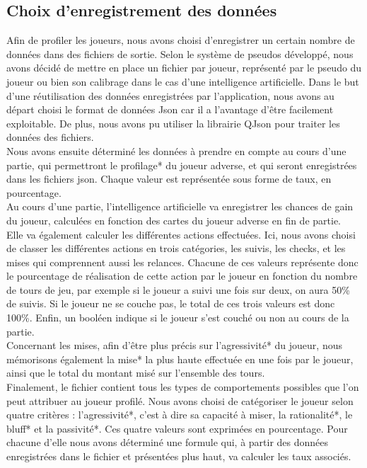 \documentclass{report}
\begin{document}
\subsection{Choix d'enregistrement des données}

\hspace{0.5cm}Afin de profiler les joueurs, nous avons choisi d'enregistrer un certain nombre de données dans des fichiers de sortie. Selon le système de pseudos développé, nous avons décidé de mettre en place un fichier par joueur, représenté par le pseudo du joueur ou bien son calibrage dans le cas d'une intelligence artificielle. Dans le but d'une réutilisation des données enregistrées par l'application, nous avons au départ choisi le format de données Json car il a l'avantage d'être facilement exploitable. De plus, nous avons pu utiliser la librairie QJson pour traiter les données des fichiers.\\

Nous avons ensuite déterminé les données à prendre en compte au cours d'une partie, qui permettront le profilage* du joueur adverse, et qui seront enregistrées dans les fichiers json. Chaque valeur est représentée sous forme de taux, en pourcentage.\\

Au cours d'une partie, l'intelligence artificielle va enregistrer les chances de gain du joueur, calculées en fonction des cartes du joueur adverse en fin de partie.\\

Elle va également calculer les différentes actions effectuées. Ici, nous avons choisi de classer les différentes actions en trois catégories, les suivis, les checks, et les mises qui comprennent aussi les relances. Chacune de ces valeurs représente donc le pourcentage de réalisation de cette action par le joueur en fonction du nombre de tours de jeu, par exemple si le joueur a suivi une fois sur deux, on aura 50\% de suivis. Si le joueur ne se couche pas, le total de ces trois valeurs est donc 100\%. Enfin, un booléen indique si le joueur s'est couché ou non au cours de la partie.\\

Concernant les mises, afin d'être plus précis sur l'agressivité* du joueur, nous mémorisons également la mise* la plus haute effectuée en une fois par le joueur, ainsi que le total du montant misé sur l'ensemble des tours.\\

Finalement, le fichier contient tous les types de comportements possibles que l'on peut attribuer au joueur profilé. Nous avons choisi de catégoriser le joueur selon quatre critères : l'agressivité*, c'est à dire sa capacité à miser, la rationalité*, le bluff* et la passivité*. Ces quatre valeurs sont exprimées en pourcentage. Pour chacune d'elle nous avons déterminé une formule qui, à partir des données enregistrées dans le fichier et présentées plus haut, va calculer les taux associés.\\
\end{document}

